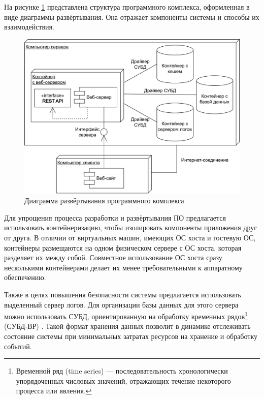 На рисунке \ref{fig:deploy} представлена структура программного комплекса, оформленная в виде диаграммы развёртывания. Она отражает компоненты системы и способы их взаимодействия. 

\begin{figure}[h]
	\centering
	\includegraphics[width=\textwidth ]{img/Deploy/deploy.drawio.png}
	\caption{Диаграмма развёртывания программного комплекса}
	\label{fig:deploy}
\end{figure} 

Для упрощения процесса разработки и развёртывания ПО предлагается использовать контейнеризацию, чтобы изолировать компоненты приложения друг от друга. В отличии от виртуальных машин, имеющих ОС хоста и гостевую ОС, контейнеры размещаются на одном физическом сервере с ОС хоста, которая разделяет их между собой. Совместное использование ОС хоста сразу несколькими контейнерами делает их менее требовательными к аппаратному обеспечению.

Также в целях повышения безопасности системы предлагается использовать выделенный сервер логов. Для организации базы данных для этого сервера можно использовать СУБД, ориентированную на обработку временных рядов\footnote{Временной ряд (time series) --- последовательность хронологически упорядоченных числовых значений, отражающих течение некоторого процесса или явления.} (СУБД-ВР) \cite{time_series}. Такой формат хранения данных позволит в динамике отслеживать состояние системы при минимальных затратах ресурсов на хранение и обработку событий.






